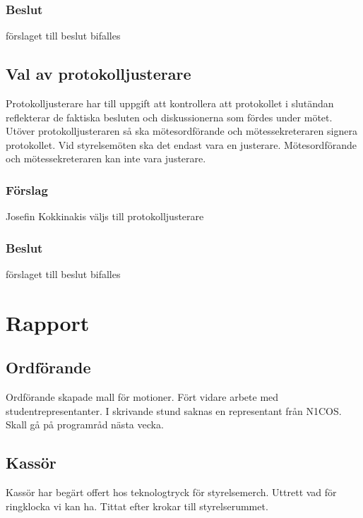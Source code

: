 \documentclass[protokoll]{dvd}
\begin{document}
\subsubsection*{Beslut}
\begin{attsatser}
    \item förslaget till beslut bifalles
\end{attsatser}

\subsection{Val av protokolljusterare}

Protokolljusterare har till uppgift att kontrollera att protokollet i slutändan reflekterar de faktiska besluten och diskussionerna som fördes under mötet.
Utöver protokolljusteraren så ska mötesordförande och mötessekreteraren signera protokollet.
Vid styrelsemöten ska det endast vara en justerare.
Mötesordförande och mötessekreteraren kan inte vara justerare.

\subsubsection*{Förslag}
\begin{attsatser}
    \item Josefin Kokkinakis väljs till protokolljusterare
\end{attsatser}
\subsubsection*{Beslut}
\begin{attsatser}
    \item förslaget till beslut bifalles
\end{attsatser}

\section{Rapport} 
\subsection{Ordförande}

Ordförande skapade mall för motioner. Fört vidare arbete med studentrepresentanter. I skrivande stund saknas en representant från N1COS. Skall gå på programråd nästa vecka.

\subsection{Kassör}
Kassör har begärt offert hos teknologtryck för styrelsemerch.
Uttrett vad för ringklocka vi kan ha. Tittat efter krokar till styrelserummet.
\end{document}
